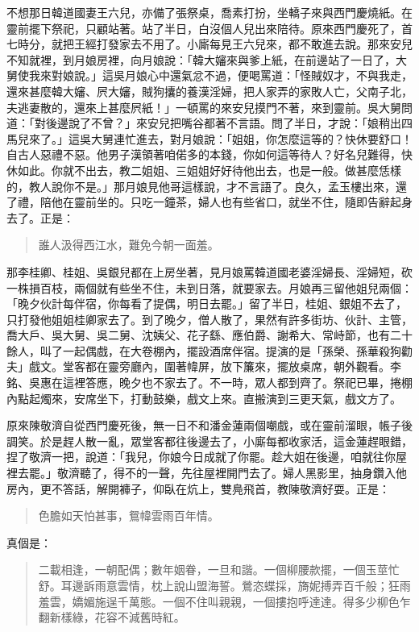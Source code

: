 不想那日韓道國妻王六兒，亦備了張祭桌，喬素打扮，坐轎子來與西門慶燒紙。在靈前擺下祭祀，只顧站著。站了半日，白沒個人兒出來陪待。原來西門慶死了，首七時分，就把王經打發家去不用了。小廝每見王六兒來，都不敢進去說。那來安兒不知就裡，到月娘房裡，向月娘說：「韓大嬸來與爹上紙，在前邊站了一日了，大舅使我來對娘說。」這吳月娘心中還氣忿不過，便喝罵道：「怪賊奴才，不與我走，還來甚麼韓大嬸、屄大嬸，賊狗攮的養漢淫婦，把人家弄的家敗人亡，父南子北，夫逃妻散的，還來上甚麼屄紙！」一頓罵的來安兒摸門不著，來到靈前。吳大舅問道：「對後邊說了不曾？」來安兒把嘴谷都著不言語。問了半日，才說：「娘稍出四馬兒來了。」這吳大舅連忙進去，對月娘說：「姐姐，你怎麼這等的？快休要舒口！自古人惡禮不惡。他男子漢領著咱偌多的本錢，你如何這等待人？好名兒難得，快休如此。你就不出去，教二姐姐、三姐姐好好待他出去，也是一般。做甚麼恁樣的，教人說你不是。」那月娘見他哥這樣說，才不言語了。良久，孟玉樓出來，還了禮，陪他在靈前坐的。只吃一鐘茶，婦人也有些省口，就坐不住，隨即告辭起身去了。正是：
\begin{quote}
誰人汲得西江水，難免今朝一面羞。
\end{quote}

那李桂卿、桂姐、吳銀兒都在上房坐著，見月娘罵韓道國老婆淫婦長、淫婦短，砍一株損百枝，兩個就有些坐不住，未到日落，就要家去。月娘再三留他姐兒兩個：「晚夕伙計每伴宿，你每看了提偶，明日去罷。」留了半日，桂姐、銀姐不去了，只打發他姐姐桂卿家去了。到了晚夕，僧人散了，果然有許多街坊、伙計、主管，喬大戶、吳大舅、吳二舅、沈姨父、花子繇、應伯爵、謝希大、常峙節，也有二十餘人，叫了一起偶戲，在大卷棚內，擺設酒席伴宿。提演的是「孫榮、孫華殺狗勸夫」戲文。堂客都在靈旁廳內，圍著幃屏，放下簾來，擺放桌席，朝外觀看。李銘、吳惠在這裡答應，晚夕也不家去了。不一時，眾人都到齊了。祭祀已畢，捲棚內點起燭來，安席坐下，打動鼓樂，戲文上來。直搬演到三更天氣，戲文方了。

原來陳敬濟自從西門慶死後，無一日不和潘金蓮兩個嘲戲，或在靈前溜眼，帳子後調笑。於是趕人散一亂，眾堂客都往後邊去了，小廝每都收家活，這金蓮趕眼錯，捏了敬濟一把，說道：「我兒，你娘今日成就了你罷。趁大姐在後邊，咱就往你屋裡去罷。」敬濟聽了，得不的一聲，先往屋裡開門去了。婦人黑影里，抽身鑽入他房內，更不答話，解開褲子，仰臥在炕上，雙鳧飛首，教陳敬濟好耍。正是：
\begin{quote}
色膽如天怕甚事，鴛幃雲雨百年情。
\end{quote}
真個是：
\begin{quote}
二載相逢，一朝配偶；數年姻眷，一旦和諧。一個柳腰款擺，一個玉莖忙舒。耳邊訴雨意雲情，枕上說山盟海誓。鶯恣蝶採，旖妮搏弄百千般；狂雨羞雲，嬌媚施逞千萬態。一個不住叫親親，一個摟抱呼達達。得多少柳色乍翻新樣綠，花容不減舊時紅。
\end{quote}

